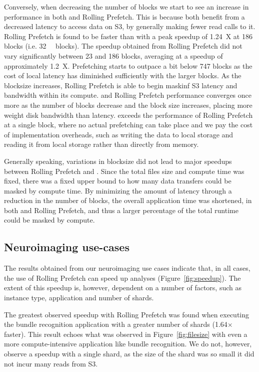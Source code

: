 \documentclass[conference]{IEEEtran}
\begin{document}
Conversely, when decreasing the number of blocks we start to see an increase in performance in both \sfs and Rolling Prefetch. This
is because both benefit from a decreased latency to access data on S3, by generally making fewer read calls to it. Rolling Prefetch is found to be faster than \sfs with a peak speedup of 1.24~X at 186 blocks (i.e. 
\SI{32}{\gibi\byte} blocks). The speedup obtained from Rolling Prefetch did not vary significantly between 23 and
186 blocks, averaging at a speedup of approximately 1.2~X. Prefetching starts to outpace \sfs a bit below
747 blocks as the cost of local latency has diminished sufficiently with the larger blocks. As the blocksize
increases, Rolling Prefetch is able to begin maskinf S3 latency and bandwidth within its compute.
\sfs and Rolling Prefetch performance converges
once more as the number of blocks decrease and the block size increases, placing more weight disk bandwidth
than latency. \sfs exceeds the performance of Rolling Prefetch at a single block, where no actual prefetching can take
place and we pay the cost of implementation overheads, such as writing the data to local storage 
and reading it from local storage rather than directly from memory.

Generally speaking, variations in blocksize did not lead to major speedups between Rolling Prefetch and \sfs. Since the
total files size and compute time was fixed, there was a fixed upper bound to how many data transfers could
be masked by compute time. By minimizing the amount of latency through a reduction in the number of blocks, the 
overall application time was shortened, in both \sfs and Rolling Prefetch, and thus a larger percentage of the total 
runtime could be masked by compute.

\subsection{Neuroimaging use-cases}

The results obtained from our neuroimaging use cases indicate that, in all
cases, the use of Rolling Prefetch can speed up analyses (Figure~\ref{fig:speedup}).
The extent of this speedup is, however, dependent on a number of
factors, such as instance type, application and number of shards.

The greatest observed speedup with Rolling Prefetch was found when executing the bundle recognition application
with a greater number of shards (1.64$\times$ faster). This result echoes what was observed in Figure~\ref{fig:filesize} with even a more compute-intensive application like 
bundle recognition. We do not, however, observe a speedup with a single shard, as the size of the shard was so small it did not incur many reads from S3.
\end{document}
